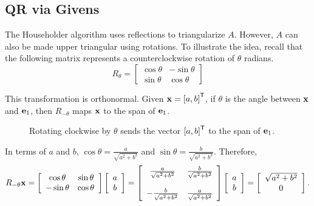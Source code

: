 \subsection*{QR via Givens} %

The Householder algorithm uses reflections to triangularize $A$.
However, $A$ can also be made upper triangular using rotations.
To illustrate the idea, recall that the following matrix represents a counterclockwise rotation of $\theta$ radians.
\[
R_\theta =
\left[\begin{array}{cc}
\cos\theta & -\sin\theta \\
\sin\theta &  \cos\theta
\end{array}\right]
\]

This transformation is orthonormal.
Given $\mathbf{x} = \left[a, b\right]^{\mathsf T}$, if $\theta$ is the angle between $\mathbf{x}$ and $\mathbf{e}_1$, then $R_{-\theta}$ maps $\mathbf{x}$ to the span of $\mathbf{e}_1$.

\begin{figure}[H]
\centering
{}
\caption{Rotating clockwise by $\theta$ sends the vector $\left[a,b\right]^{\mathsf T}$ to the span of $\mathbf{e}_1$.}
\label{fig:Givens-rotation}
\end{figure}

In terms of $a$ and $b$, $\cos \theta =  \frac{a}{\sqrt{a^2+b^2}}$ and $\sin\theta = \frac{b}{\sqrt{a^2+b^2}}$.
Therefore,
\[
R_{-\theta}\mathbf{x}
=
\left[\begin{array}{cc}
\cos\theta  & \sin\theta \\
-\sin\theta & \cos\theta \\
\end{array}\right]
\left[\begin{array}{c} a \\ b \end{array}\right]
=
\left[\begin{array}{cc}
 \frac{a}{\sqrt{a^2+b^2}} & \frac{b}{\sqrt{a^2+b^2}} \\ \\
-\frac{b}{\sqrt{a^2+b^2}} & \frac{a}{\sqrt{a^2+b^2}} \\
\end{array}\right]
\left[\begin{array}{c} a \\ b \end{array}\right]
=
\left[\begin{array}{c} \sqrt{a^2+b^2} \\ 0 \end{array}\right].
\]

